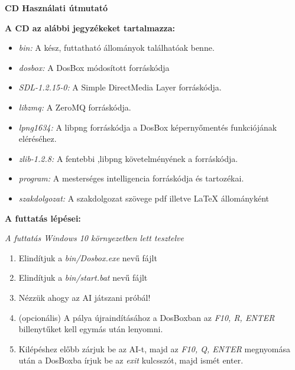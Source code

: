 \pagestyle{empty}

\noindent \textbf{\Large CD Használati útmutató}

\vskip 1cm

\textbf{A CD az alábbi jegyzékeket tartalmazza:}
\begin{itemize}
\item \textit{bin:} A kész, futtatható állományok találhatóak benne.
\item \textit{dosbox:} A DosBox módosított forráskódja
\item \textit{SDL-1.2.15-0:} A Simple DirectMedia Layer forráskódja.
\item \textit{libzmq:} A ZeroMQ forráskódja.
\item \textit{lpng1634:} A libpng forráskódja a DosBox képernyőmentés funkciójának eléréséhez.
\item \textit{zlib-1.2.8:} A fentebbi ,libpng követelményének a forráskódja.
\item \textit{program:} A mesterséges intelligencia forráskódja és tartozékai.
\item \textit{szakdolgozat:} A szakdolgozat szövege pdf illetve {\LaTeX}  állományként
\end{itemize}

\textbf{A futtatás lépései:}

\textit{A futtatás Windows 10 környezetben lett tesztelve}

\begin{enumerate}
    \item Elindítjuk a \textit{bin/Dosbox.exe} nevű fájlt
    \item Elindítjuk a \textit{bin/start.bat} nevű fájlt
    \item Nézzük ahogy az AI játszani próbál!
    \item (opcionális) A pálya újraindításához a DosBoxban az \textit{F10, R, ENTER} billenytűket kell egymás után lenyomni.
    \item Kilépéshez előbb zárjuk be az AI-t, majd az \textit{F10, Q, ENTER} megnyomása után a DosBoxba írjuk be az \textit{exit} kulcsszót, majd ismét enter.
\end{enumerate}
